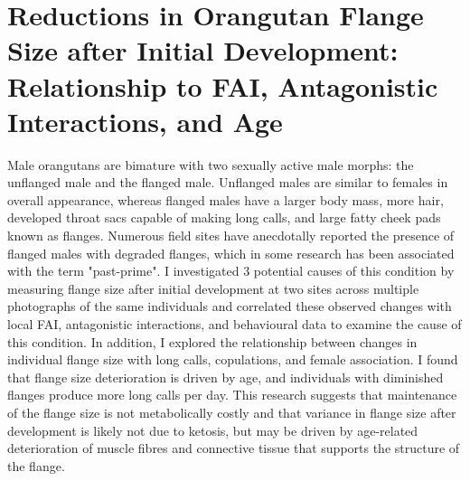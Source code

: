 
\chapter{Reductions in Orangutan Flange Size after Initial Development: Relationship to FAI, Antagonistic Interactions, and Age}

Male orangutans are bimature with two sexually active male morphs: the unflanged male and the flanged male. Unflanged males are similar to females in overall appearance, whereas flanged males have a larger body mass, more hair, developed throat sacs capable of making long calls, and large fatty cheek pads known as flanges. Numerous field sites have anecdotally reported the presence of flanged males with degraded flanges, which in some research has been associated with the term "past-prime". I investigated 3 potential causes of this condition by measuring flange size after initial development at two sites across multiple photographs of the same individuals and correlated these observed changes with local FAI, antagonistic interactions, and behavioural data to examine the cause of this condition. In addition, I explored the relationship between changes in individual flange size with long calls, copulations, and female association. I found that flange size deterioration is driven by age, and individuals with diminished flanges produce more long calls per day. This research suggests that maintenance of the flange size is not metabolically costly and that variance in flange size after development is likely not due to ketosis, but may be driven by age-related deterioration of muscle fibres and connective tissue that supports the structure of the flange.

